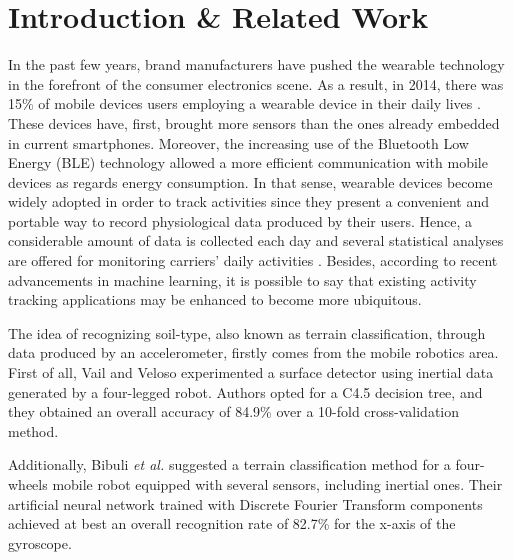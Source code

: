 \documentclass[10pt,conference]{IEEEtran}
\begin{document}
\section{Introduction \& Related Work}
\label{sec:introduction}
In the past few years, brand manufacturers have pushed the wearable technology in the forefront of the consumer electronics scene. As a result, in 2014, there was 15\% of mobile devices users employing a wearable device in their daily lives %
\cite{Nielsen2014}. These devices have, first, brought more sensors than the ones already embedded in current smartphones. Moreover, the increasing use of the Bluetooth Low Energy (BLE) technology \cite{Taplett} allowed a more efficient communication with mobile devices as regards energy consumption. In that sense, wearable devices become widely adopted in order to track activities since they present a convenient and portable way to record physiological data produced by their users. Hence, a considerable amount of data is collected each day and several statistical analyses are offered for monitoring carriers' daily activities \cite{Patel2015}. Besides, according to recent advancements in machine learning, it is possible to say that existing activity tracking applications may be enhanced to become more ubiquitous. %

The idea of recognizing soil-type, also known as terrain classification, through data produced by an accelerometer, firstly comes from the mobile robotics area. First of all, Vail and Veloso \cite{Vail2004} experimented a surface detector using inertial data generated by a four-legged robot. Authors opted for a C4.5 decision tree, and they obtained an overall accuracy of 84.9\% over a 10-fold cross-validation method.


Additionally, Bibuli \textit{et al.} \cite{Bibuli2007} suggested a terrain classification method for a four-wheels mobile robot equipped with several sensors, including inertial ones. Their artificial neural network trained with Discrete Fourier Transform components achieved at best an overall recognition rate of 82.7\% for the x-axis of the gyroscope.
\end{document}
